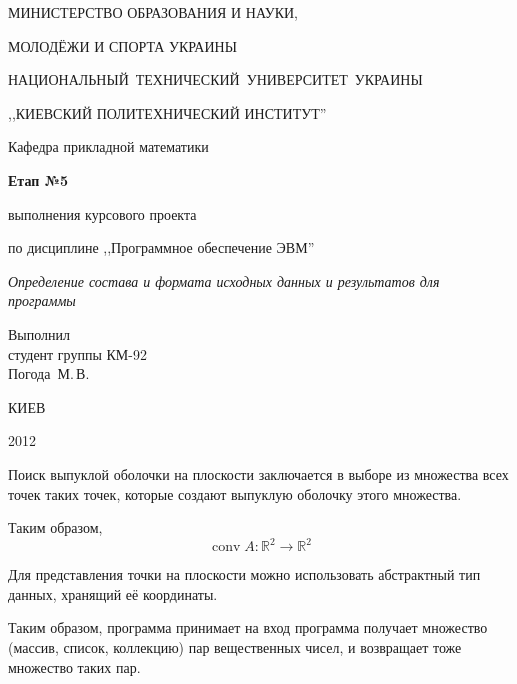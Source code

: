 \documentclass[a4paper,12pt,notitlepage,headsepline,pdftex]{scrartcl}
\begin{document}
\begin{titlepage}
  \begin{center}
    \large
    \MakeUppercase{Министерство образования и науки,}

    \MakeUppercase{молодёжи и спорта Украины}

    \mbox{\MakeUppercase{Национальный технический университет Украины}}

    \MakeUppercase{,,Киевский политехнический институт''}

    \addvspace{6pt}

    \normalsize
    Кафедра прикладной математики

    \vfill

    \textbf{Етап №5}

    выполнения курсового проекта

    по дисциплине ,,Программное обеспечение ЭВМ''

    \emph{Определение состава и формата исходных данных и результатов для
    программы}
  \end{center}

  \vfill

  \noindent
  Выполнил\\
  студент группы КМ-92\\
  Погода~М.\,В.\\
  \vfill

  \begin{center}
    КИЕВ

    2012
  \end{center}
\end{titlepage}

Поиск выпуклой оболочки на плоскости заключается в выборе из множества всех
точек таких точек, которые создают выпуклую оболочку этого множества.

Таким образом,
\begin{equation}
  \mathop{conv} A : \mathbb{R}^2 \rightarrow \mathbb{R}^2
  \label{eq:1}
\end{equation}

Для представления точки на плоскости можно использовать абстрактный тип
данных, хранящий её координаты.

Таким образом, программа принимает на вход программа получает множество
(массив, список, коллекцию) пар вещественных чисел, и возвращает тоже
множество таких пар.
\end{document}
